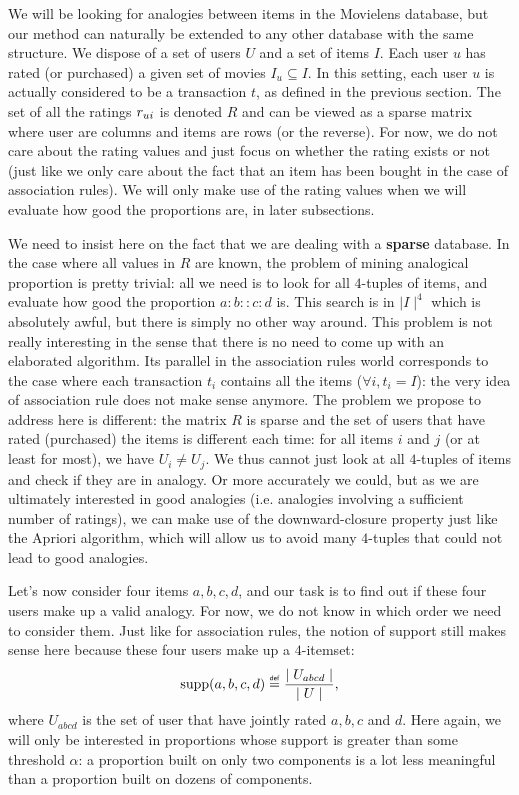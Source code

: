 We will be looking for analogies between items in the Movielens database, but
our method can naturally be extended to any other database with the same
structure.  We dispose of a set of users $U$ and a set of items $I$. Each user
$u$ has rated (or purchased) a given set of movies $I_u \subseteq I$. In this
setting, each user $u$ is actually considered to be a transaction $t$, as
defined in the previous section. The set of all the ratings $r_{ui}$ is denoted
$R$ and can be viewed as a sparse matrix where user are columns and items are
rows (or the reverse).  For now, we do not care about the rating values and
just focus on whether the rating exists or not (just like we only care about
the fact that an item has been bought in the case of association rules). We
will only make use of the rating values when we will evaluate how good the
proportions are, in later subsections.

We need to insist here on the fact that we are dealing with a \textbf{sparse}
database.  In the case where all values in $R$ are known, the problem of mining
analogical proportion is pretty trivial: all we need is to look for all
$4$-tuples of items, and evaluate how good the proportion $a:b::c:d$ is. This
search is in $\mid I \mid^4$ which is absolutely awful, but there is simply no
other way around. This problem is not really interesting in the sense that
there is no need to come up with an elaborated algorithm. Its parallel in the
association rules world corresponds to the case where each transaction
$t_i$ contains all the items ($\forall i, t_i = I$): the very idea of
association rule does not make sense anymore. The problem we propose to address
here is different: the matrix $R$ is sparse and the set of users that have
rated (purchased) the items is different each time: for all items $i$ and $j$
(or at least for most), we have $U_i \neq U_j$. We thus cannot just look at all
$4$-tuples of items and check if they are in analogy. Or more accurately we
could, but as we are ultimately interested in good analogies (i.e. analogies
involving a sufficient number of ratings), we can make use of the
downward-closure property just like the Apriori algorithm, which will allow us
to avoid many $4$-tuples that could not lead to good analogies.

Let's now consider four items $a, b, c, d$, and our task is to find out if
these four users make up a valid analogy. For now, we do not know in which
order we need to consider them.  Just like for association rules, the notion of
support still makes sense here because these four users make up a $4$-itemset:
$$\supp(a, b, c, d) \eqdef \frac{\mid U_{abcd}\mid}{\mid U\mid},$$
where $U_{abcd}$ is the set of user that have jointly rated $a, b, c$ and $d$.
Here again, we will only be interested in proportions whose support is greater
than some threshold $\alpha$: a proportion built on only two components is a
lot less meaningful than a proportion built on dozens of components.

